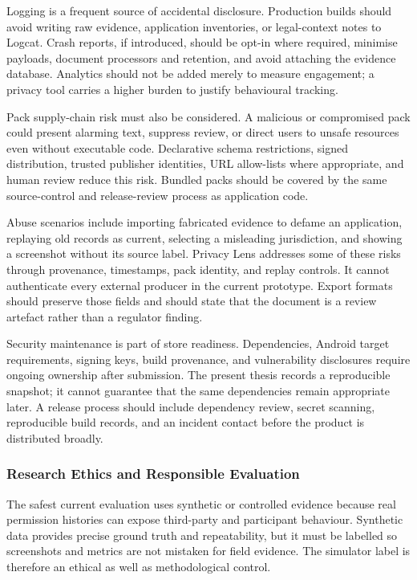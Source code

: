 Logging is a frequent source of accidental disclosure. Production builds should avoid writing raw evidence, application inventories, or legal-context notes to Logcat. Crash reports, if introduced, should be opt-in where required, minimise payloads, document processors and retention, and avoid attaching the evidence database. Analytics should not be added merely to measure engagement; a privacy tool carries a higher burden to justify behavioural tracking.

Pack supply-chain risk must also be considered. A malicious or compromised pack could present alarming text, suppress review, or direct users to unsafe resources even without executable code. Declarative schema restrictions, signed distribution, trusted publisher identities, URL allow-lists where appropriate, and human review reduce this risk. Bundled packs should be covered by the same source-control and release-review process as application code.

Abuse scenarios include importing fabricated evidence to defame an application, replaying old records as current, selecting a misleading jurisdiction, and showing a screenshot without its source label. Privacy Lens addresses some of these risks through provenance, timestamps, pack identity, and replay controls. It cannot authenticate every external producer in the current prototype. Export formats should preserve those fields and should state that the document is a review artefact rather than a regulator finding.

Security maintenance is part of store readiness. Dependencies, Android target requirements, signing keys, build provenance, and vulnerability disclosures require ongoing ownership after submission. The present thesis records a reproducible snapshot; it cannot guarantee that the same dependencies remain appropriate later. A release process should include dependency review, secret scanning, reproducible build records, and an incident contact before the product is distributed broadly.

\subsubsection{Research Ethics and Responsible Evaluation}

The safest current evaluation uses synthetic or controlled evidence because real permission histories can expose third-party and participant behaviour. Synthetic data provides precise ground truth and repeatability, but it must be labelled so screenshots and metrics are not mistaken for field evidence. The simulator label is therefore an ethical as well as methodological control.

